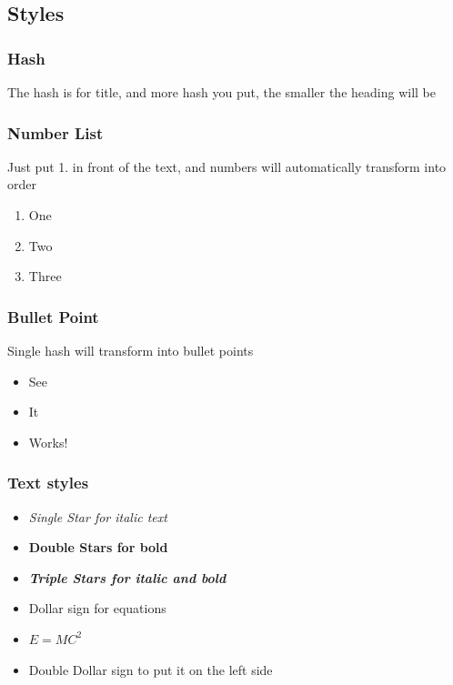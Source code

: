 \documentclass[
]{article}
\begin{document}
\hypertarget{styles}{%
\subsection{Styles}\label{styles}}

\hypertarget{hash}{%
\subsubsection{Hash}\label{hash}}

The hash is for title, and more hash you put, the smaller the heading
will be

\hypertarget{number-list}{%
\subsubsection{Number List}\label{number-list}}

Just put 1. in front of the text, and numbers will automatically
transform into order

\begin{enumerate}
\def\labelenumi{\arabic{enumi}.}
\item
  One
\item
  Two
\item
  Three
\end{enumerate}

\hypertarget{bullet-point}{%
\subsubsection{Bullet Point}\label{bullet-point}}

Single hash will transform into bullet points

\begin{itemize}
\item
  See
\item
  It
\item
  Works!
\end{itemize}

\hypertarget{text-styles}{%
\subsubsection{Text styles}\label{text-styles}}

\begin{itemize}
\item
  \emph{Single Star for italic text}
\item
  \textbf{Double Stars for bold}
\item
  \textbf{\emph{Triple Stars for italic and bold}}
\item
  Dollar sign for equations
\item
  \(E=MC^2\)
\item
  Double Dollar sign to put it on the left side
\end{itemize}
\end{document}
